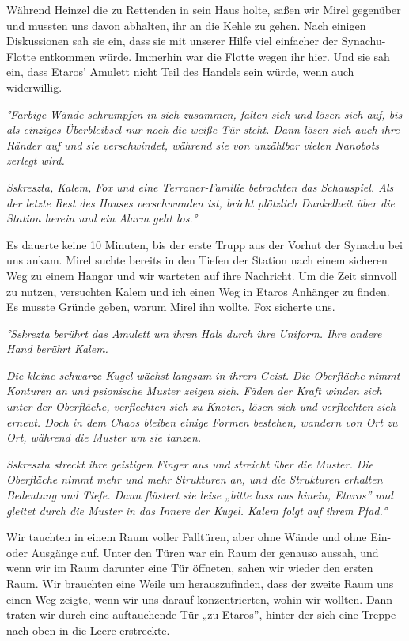 \documentclass[11pt]{article}
\begin{document}
Während Heinzel die zu Rettenden in sein Haus holte, saßen wir Mirel
gegenüber und mussten uns davon abhalten, ihr an die Kehle zu gehen.
Nach einigen Diskussionen sah sie ein, dass sie mit unserer Hilfe viel
einfacher der Synachu-Flotte entkommen würde. Immerhin war die Flotte
wegen ihr hier. Und sie sah ein, dass Etaros' Amulett nicht Teil des
Handels sein würde, wenn auch widerwillig.

\emph{°Farbige Wände schrumpfen in sich zusammen, falten sich und lösen
sich auf, bis als einziges Überbleibsel nur noch die weiße Tür steht.
Dann lösen sich auch ihre Ränder auf und sie verschwindet, während sie
von unzählbar vielen Nanobots zerlegt wird.}

\emph{Sskreszta, Kalem, Fox und eine Terraner-Familie betrachten das
Schauspiel. Als der letzte Rest des Hauses verschwunden ist, bricht
plötzlich Dunkelheit über die Station herein und ein Alarm geht los.°}

Es dauerte keine 10 Minuten, bis der erste Trupp aus der Vorhut der
Synachu bei uns ankam. Mirel suchte bereits in den Tiefen der Station
nach einem sicheren Weg zu einem Hangar und wir warteten auf ihre
Nachricht. Um die Zeit sinnvoll zu nutzen, versuchten Kalem und ich
einen Weg in Etaros Anhänger zu finden. Es musste Gründe geben, warum
Mirel ihn wollte. Fox sicherte uns.

\emph{°Sskrezta berührt das Amulett um ihren Hals durch ihre Uniform.
Ihre andere Hand berührt Kalem.}

\emph{Die kleine schwarze Kugel wächst langsam in ihrem Geist. Die
Oberfläche nimmt Konturen an und psionische Muster zeigen sich. Fäden
der Kraft winden sich unter der Oberfläche, verflechten sich zu Knoten,
lösen sich und verflechten sich erneut. Doch in dem Chaos bleiben einige
Formen bestehen, wandern von Ort zu Ort, während die Muster um sie
tanzen.}

\emph{Sskreszta streckt ihre geistigen Finger aus und streicht über die
Muster. Die Oberfläche nimmt mehr und mehr Strukturen an, und die
Strukturen erhalten Bedeutung und Tiefe. Dann flüstert sie leise „bitte
lass uns hinein, Etaros'' und gleitet durch die Muster in das Innere der
Kugel. Kalem folgt auf ihrem Pfad.°}

Wir tauchten in einem Raum voller Falltüren, aber ohne Wände und ohne
Ein- oder Ausgänge auf. Unter den Türen war ein Raum der genauso aussah,
und wenn wir im Raum darunter eine Tür öffneten, sahen wir wieder den
ersten Raum. Wir brauchten eine Weile um herauszufinden, dass der zweite
Raum uns einen Weg zeigte, wenn wir uns darauf konzentrierten, wohin wir
wollten. Dann traten wir durch eine auftauchende Tür „zu Etaros'',
hinter der sich eine Treppe nach oben in die Leere erstreckte.
\end{document}
